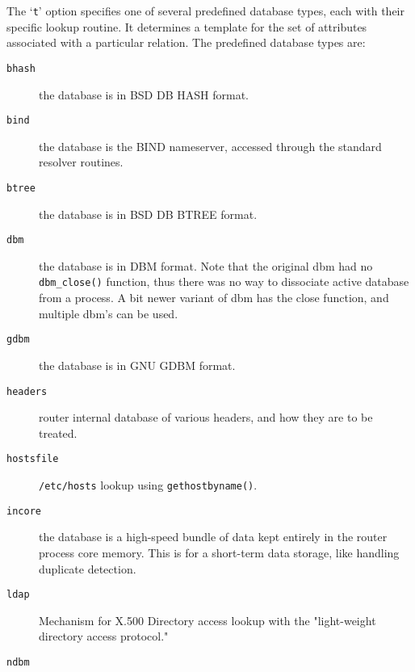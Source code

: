 The `{\tt t}' option specifies one of several predefined database types,
each with their specific lookup routine.
It determines a template for the set of attributes associated with
a particular relation.
The predefined database types are:


\begin{description}
\item[{\tt bhash}] \mbox{}

the database is in BSD DB HASH format.

\item[{\tt bind}] \mbox{}

the database is the BIND nameserver, accessed through the standard resolver routines.

\item[{\tt btree}] \mbox{}

the database is in BSD DB BTREE format.

\item[{\tt dbm}] \mbox{}

the database is in DBM format.
Note that the original dbm had no {\tt dbm\_close()} function, thus
there was no way to dissociate active database from a process.
A bit newer variant of dbm has the close function, and multiple
dbm's can be used.

\item[{\tt gdbm}] \mbox{}

the database is in GNU GDBM format.

\item[{\tt headers}] \mbox{}

router internal database of various headers, and how they are
to be treated.

\item[{\tt hostsfile}] \mbox{}

{\tt /etc/hosts} lookup using {\tt gethostbyname()}.

\item[{\tt incore}] \mbox{}

the database is a high-speed bundle of data kept entirely in the router process core memory.  This is for a short-term data storage, like handling duplicate detection.

\item[{\tt ldap}] \mbox{}

Mechanism for X.500 Directory access lookup with the "light-weight
directory access protocol."

\item[{\tt ndbm}] \mbox{}


\end{description}
